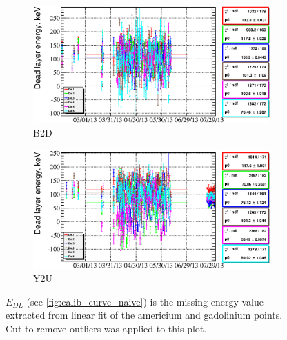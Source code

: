 \documentclass[a4paper,12pt]{article}
\begin{document}
\newcommand\edllabellabel{$E_{DL}$ (see \cref{fig:calib_curve_naive}) is the missing
energy value extracted from linear fit of the americium and gadolinium points.
Cut to remove outliers was applied to this plot.}
\begin{figure}
\begin{subfigure}[b]{0.5\textwidth}
\includegraphics[width=\textwidth]{gfx/run13_alpha_study/B2D/c_chDeadLayerEnergy_by_day_B2D.eps}
\caption{B2D}
\end{subfigure}
%
\begin{subfigure}[b]{0.5\textwidth}
\includegraphics[width=\textwidth]{gfx/run13_alpha_study/Y2U/c_chDeadLayerEnergy_by_day_Y2U.eps}
\caption{Y2U}
\end{subfigure}
%
\caption{\edllabellabel{}}
\label{fig:e_dl}
\end{figure}
\end{document}
